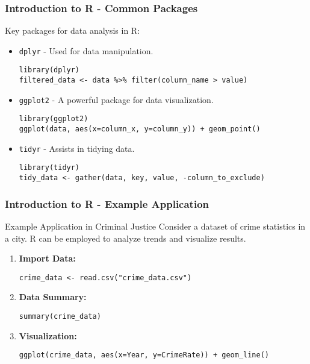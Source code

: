 \documentclass[aspectratio=169]{beamer}
\begin{document}
\begin{frame}[fragile]
    \frametitle{Introduction to R - Common Packages}
    Key packages for data analysis in R:
    \begin{itemize}
        \item \texttt{dplyr} - Used for data manipulation.
        \begin{lstlisting}
library(dplyr)
filtered_data <- data %>% filter(column_name > value)
        \end{lstlisting}
        
        \item \texttt{ggplot2} - A powerful package for data visualization.
        \begin{lstlisting}
library(ggplot2)
ggplot(data, aes(x=column_x, y=column_y)) + geom_point()
        \end{lstlisting}
        
        \item \texttt{tidyr} - Assists in tidying data.
        \begin{lstlisting}
library(tidyr)
tidy_data <- gather(data, key, value, -column_to_exclude)
        \end{lstlisting}
    \end{itemize}
\end{frame}

\begin{frame}[fragile]
    \frametitle{Introduction to R - Example Application}
    \begin{block}{Example Application in Criminal Justice}
        Consider a dataset of crime statistics in a city. R can be employed to analyze trends and visualize results.
    \end{block}
    \begin{enumerate}
        \item \textbf{Import Data:}
        \begin{lstlisting}
crime_data <- read.csv("crime_data.csv")
        \end{lstlisting}
        
        \item \textbf{Data Summary:}
        \begin{lstlisting}
summary(crime_data)
        \end{lstlisting}
        
        \item \textbf{Visualization:}
        \begin{lstlisting}
ggplot(crime_data, aes(x=Year, y=CrimeRate)) + geom_line()
        \end{lstlisting}
    \end{enumerate}
\end{frame}
\end{document}
